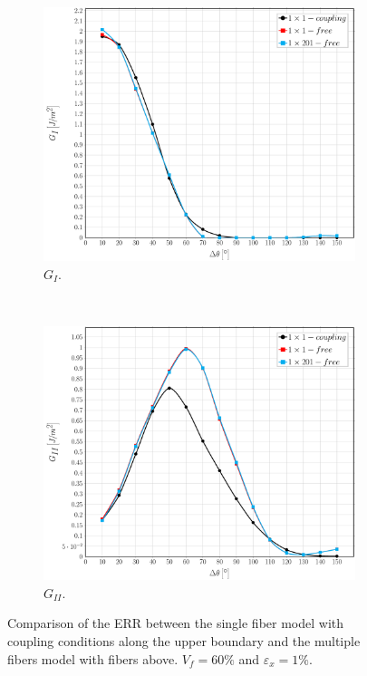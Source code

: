 \documentclass[review]{elsarticle}
\begin{document}
\begin{figure}[!h]
\centering
    \begin{subfigure}[b]{0.475\textwidth}
        \includegraphics[width=\textwidth]{comparecouplingabovesidefibers-vf60-GI.pdf}
        \caption{$G_{I}$.}\label{subfig:comparisoncoupling60MI}
    \end{subfigure} ~
   \begin{subfigure}[b]{0.475\textwidth}
        \includegraphics[width=\textwidth]{comparecouplingabovesidefibers-vf60-GII.pdf}
        \caption{$G_{II}$.}\label{subfig:comparisoncoupling60MII}
    \end{subfigure}

\caption{Comparison of the ERR between the single fiber model with coupling conditions along the upper boundary and the multiple fibers model with fibers above. $V_{f}=60\%$ and $\varepsilon_{x}=1\%$.}\label{fig:comparisoncoupling}
\end{figure}
\end{document}
